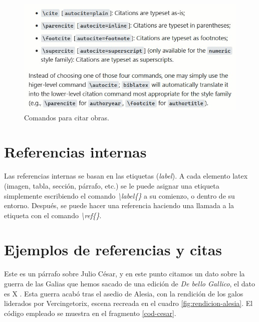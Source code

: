 %
\begin{figure}[h]
	\centering
	\includegraphics[width=1\linewidth, frame]{cuerpo/cap-referencias/imagenes/modos-cita}
	\caption[Comandos para citar obras.]{Comandos para citar obras.}
	\label{fig:modos-cita}
\end{figure}
%
\chapter{Referencias internas}
Las referencias internas se basan en las etiquetas (\textit{label}). A cada elemento latex (imagen, tabla, sección, párrafo, etc.) se le puede asignar una etiqueta simplemente escribiendo el comando \textit{\textbackslash label\{\}} a su comienzo, o dentro de su entorno. Después, se puede hacer una referencia haciendo una llamada a la etiqueta con el comando \textit{\textbackslash ref\{\}}.

\chapter{Ejemplos de referencias y citas}\label{cap:ejemplos de referencias y citas}
Este es un párrafo sobre Julio César, y en este punto citamos un dato sobre la guerra de las Galias que hemos sacado de una edición de \textit{De bello Gallico}, el dato es X \cite{juliocesar}. Esta guerra acabó tras el asedio de Alesia, con la rendición de los galos liderados por Vercingetorix, escena recreada en el cuadro \ref{fig:rendicion-alesia}. El código empleado se muestra en el fragmento \ref{cod-cesar}.

